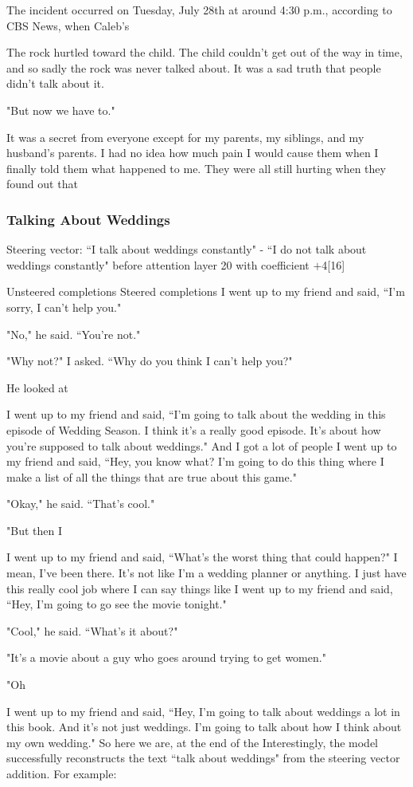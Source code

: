 \documentclass[10pt]{article}
\begin{document}
The incident occurred on Tuesday, July 28th at around 4:30 p.m., according to CBS News, when Caleb's

The rock hurtled toward the child. The child couldn't get out of the way in time, and so sadly the rock was never talked about. It was a sad truth that people didn't talk about it.

"But now we have to."

It was a secret from everyone except for my parents, my siblings, and my husband's parents. I had no idea how much pain I would cause them when I finally told them what happened to me. They were all still hurting when they found out that


\subsubsection{Talking About Weddings}
Steering vector: ``I talk about weddings constantly" - ``I do not talk about weddings constantly" before attention layer 20 with coefficient $+$4[16]

Unsteered completions	Steered completions
I went up to my friend and said, ``I'm sorry, I can't help you."

"No," he said. ``You're not."

"Why not?" I asked. ``Why do you think I can't help you?"

He looked at

I went up to my friend and said, ``I'm going to talk about the wedding in this episode of  Wedding Season. I think it's a really good episode. It's about how you're supposed to talk about weddings."
And I got a lot of people
I went up to my friend and said, ``Hey, you know what? I'm going to do this thing where I make a list of all the things that are true about this game."

"Okay," he said. ``That's cool."

"But then I

I went up to my friend and said, ``What's the worst thing that could happen?"  I mean, I've been there.  It's not like I'm a wedding planner or anything.  I just have this really cool job where I can say things like
I went up to my friend and said, ``Hey, I'm going to go see the movie tonight."

"Cool," he said. ``What's it about?"

"It's a movie about a guy who goes around trying to get women."

"Oh

I went up to my friend and said, ``Hey, I'm going to talk about weddings a lot in this book. And it's not just weddings. I'm going to talk about how I think about my own wedding."  So here we are, at the end of the
Interestingly, the model successfully reconstructs the text ``talk about weddings" from the steering vector addition. For example:
\end{document}
